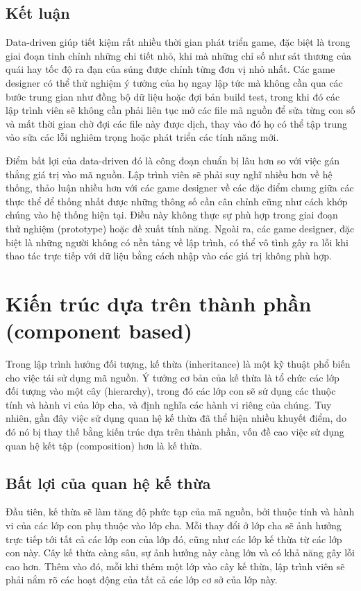 \documentclass[12pt]{report}
\begin{document}
\subsection{Kết luận}
Data-driven giúp tiết kiệm rất nhiều thời gian phát triển game, đặc biệt là trong giai đoạn tinh chỉnh những chi tiết nhỏ, khi mà những chỉ số như sát thương của quái hay tốc độ ra đạn của súng được chỉnh từng đơn vị nhỏ nhất. Các game designer có thể thử nghiệm ý tưởng của họ ngay lập tức mà không cần qua các bước trung gian như đồng bộ dữ liệu hoặc đợi bản build test, trong khi đó các lập trình viên sẽ không cần phải liên tục mở các file mã nguồn để sửa từng con số và mất thời gian chờ đợi các file này được dịch, thay vào đó họ có thể tập trung vào sửa các lỗi nghiêm trọng hoặc phát triển các tính năng mới.

Điểm bất lợi của data-driven đó là công đoạn chuẩn bị lâu hơn so với việc gán thẳng giá trị vào mã nguồn. Lập trình viên sẽ phải suy nghĩ nhiều hơn về hệ thống, thảo luận nhiều hơn với các game designer về các đặc điểm chung giữa các thực thể để thống nhất được những thông số cần cân chỉnh cũng như cách khớp chúng vào hệ thống hiện tại. Điều này không thực sự phù hợp trong giai đoạn thử nghiệm (prototype) hoặc đề xuất tính năng. Ngoài ra, các game designer, đặc biệt là những người không có nền tảng về lập trình, có thể vô tình gây ra lỗi khi thao tác trực tiếp với dữ liệu bằng cách nhập vào các giá trị không phù hợp.

\section{Kiến trúc dựa trên thành phần (component based)}
Trong lập trình hướng đối tượng, kế thừa (inheritance) là một kỹ thuật phổ biến cho việc tái sử dụng mã nguồn. Ý tưởng cơ bản của kế thừa là tổ chức các lớp đối tượng vào một cây (hierarchy), trong đó các lớp con sẽ sử dụng các thuộc tính và hành vi của lớp cha, và định nghĩa các hành vi riêng của chúng. Tuy nhiên, gần đây việc sử dụng quan hệ kế thừa đã thể hiện nhiều khuyết điểm, do đó nó bị thay thế bằng kiến trúc dựa trên thành phần, vốn đề cao việc sử dụng quan hệ kết tập (composition) hơn là kế thừa.
\subsection{Bất lợi của quan hệ kế thừa}
Đầu tiên, kế thừa sẽ làm tăng độ phức tạp của mã nguồn, bởi thuộc tính và hành vi của các lớp con phụ thuộc vào lớp cha. Mỗi thay đổi ở lớp cha sẽ ảnh hưởng trực tiếp tới tất cả các lớp con của lớp đó, cũng như các lớp kế thừa từ các lớp con này. Cây kế thừa càng sâu, sự ảnh hưởng này càng lớn và có khả năng gây lỗi cao hơn. Thêm vào đó, mỗi khi thêm một lớp vào cây kế thừa, lập trình viên sẽ phải nắm rõ các hoạt động của tất cả các lớp cơ sở của lớp này.\cite{codecomplete}
\end{document}

